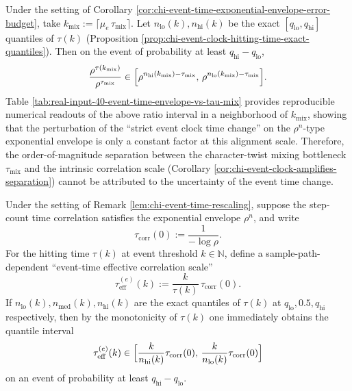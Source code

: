 

\begin{remark}
\label{cor:chi-event-time-envelope-vs-tau-mix}
Under the setting of Corollary \ref{cor:chi-event-time-exponential-envelope-error-budget}, take $k_{\mathrm{mix}}:=\lceil \mu_e\,\tau_{\mathrm{mix}}\rceil$.
Let $n_{\mathrm{lo}}(k),n_{\mathrm{hi}}(k)$ be the exact $[q_{\mathrm{lo}},q_{\mathrm{hi}}]$ quantiles of $\tau(k)$ (Proposition \ref{prop:chi-event-clock-hitting-time-exact-quantiles}).
Then on the event of probability at least $q_{\mathrm{hi}}-q_{\mathrm{lo}}$,
$$
\frac{\rho^{\tau(k_{\mathrm{mix}})}}{\rho^{\tau_{\mathrm{mix}}}}
\in\Bigl[\rho^{n_{\mathrm{hi}}(k_{\mathrm{mix}})-\tau_{\mathrm{mix}}},\,\rho^{n_{\mathrm{lo}}(k_{\mathrm{mix}})-\tau_{\mathrm{mix}}}\Bigr].
$$
Table \ref{tab:real-input-40-event-time-envelope-vs-tau-mix} provides reproducible numerical readouts of the above ratio interval in a neighborhood of $k_{\mathrm{mix}}$, showing that the perturbation of the ``strict event clock time change'' on the $\rho^n$-type exponential envelope is only a constant factor at this alignment scale.
Therefore, the order-of-magnitude separation between the character-twist mixing bottleneck $\tau_{\mathrm{mix}}$ and the intrinsic correlation scale (Corollary \ref{cor:chi-event-clock-amplifies-separation}) cannot be attributed to the uncertainty of the event time change.
\end{remark}



\begin{remark}
\label{prop:chi-event-time-tau-eff}
Under the setting of Remark \ref{lem:chi-event-time-rescaling}, suppose the step-count time correlation satisfies the exponential envelope $\rho^n$, and write
$$
\tau_{\mathrm{corr}}(0):=\frac{1}{-\log\rho}.
$$
For the hitting time $\tau(k)$ at event threshold $k\in\mathbb{N}$, define a sample-path-dependent ``event-time effective correlation scale''
$$
\tau_{\mathrm{eff}}^{(e)}(k):=\frac{k}{\tau(k)}\,\tau_{\mathrm{corr}}(0).
$$
If $n_{\mathrm{lo}}(k),n_{\mathrm{med}}(k),n_{\mathrm{hi}}(k)$ are the exact quantiles of $\tau(k)$ at $q_{\mathrm{lo}},0.5,q_{\mathrm{hi}}$ respectively, then by the monotonicity of $\tau(k)$ one immediately obtains the quantile interval
$$
\tau_{\mathrm{eff}}^{(e)}(k)\in\Bigl[\frac{k}{n_{\mathrm{hi}}(k)}\tau_{\mathrm{corr}}(0),\,\frac{k}{n_{\mathrm{lo}}(k)}\tau_{\mathrm{corr}}(0)\Bigr]
$$
on an event of probability at least $q_{\mathrm{hi}}-q_{\mathrm{lo}}$.
\end{remark}

